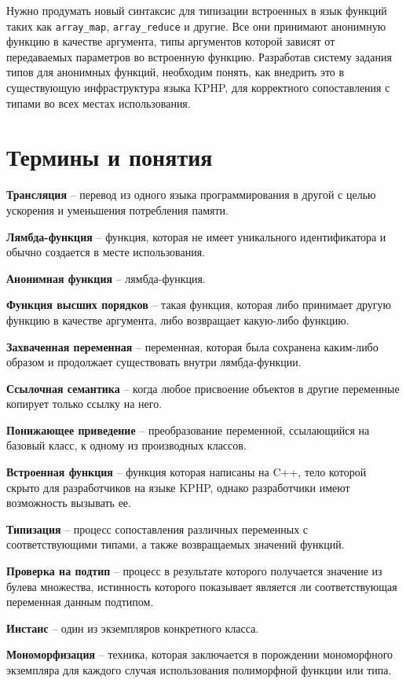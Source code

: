 Нужно продумать новый синтаксис для типизации встроенных в язык функций таких как \verb|array_map|, \verb|array_reduce| и другие.
Все они принимают анонимную функцию в качестве аргумента, типы аргументов которой зависят от передаваемых параметров во встроенную функцию.
Разработав систему задания типов для анонимных функций, необходим понять, как внедрить это в существующую инфраструктура языка KPHP, для корректного сопоставления с типами во всех местах использования.

\section{Термины и понятия}
\textbf{Трансляция} -- перевод из одного языка программирования в другой с целью ускорения и уменьшения потребления памяти.

\textbf{Лямбда-функция} -- функция, которая не имеет уникального идентификатора и обычно создается в месте использования.

\textbf{Анонимная функция} -- лямбда-функция.

\textbf{Функция высших порядков} -- такая функция, которая либо принимает другую функцию в качестве аргумента, либо возвращает какую-либо функцию.

\textbf{Захваченная переменная} -- переменная, которая была сохранена каким-либо образом и продолжает существовать внутри лямбда-функции.

\textbf{Ссылочная семантика} -- когда любое присвоение объектов в другие переменные копирует только ссылку на него.

\textbf{Понижающее приведение} -- преобразование переменной, ссылающийся на базовый класс, к одному из производных классов.

\textbf{Встроенная функция} -- функция которая написаны на C++, тело которой скрыто для разработчиков на языке KPHP, однако разработчики имеют возможность вызывать ее.

\textbf{Типизация} -- процесс сопоставления различных переменных с соответствующими типами, а также возвращаемых значений функций.

\textbf{Проверка на подтип} -- процесс в результате которого получается значение из булева множества, истинность которого показывает является ли соответствующая переменная данным подтипом.

\textbf{Инстанс} -- один из экземпляров конкретного класса.

\textbf{Мономорфизация} -- техника, которая заключается в порождении мономорфного экземпляра для каждого случая использования полиморфной функции или типа.

